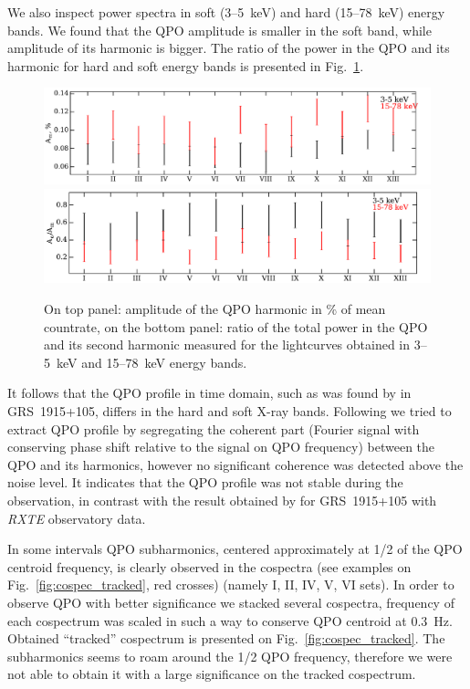 \documentclass[a4paper,fleqn,usenatbib]{mnras}
\begin{document}
We also inspect power spectra in soft (3--5~keV) and hard (15--78~keV) energy bands.
We found that the QPO amplitude is smaller in the soft band, while amplitude of its harmonic is bigger.
The ratio of the power in the QPO and its harmonic for hard and soft energy bands is presented in Fig.~\ref{fig:qpo_ratio}.
\begin{figure}
\includegraphics[width=\columnwidth]{qpo_amplitude.pdf}
\includegraphics[width=\columnwidth]{QPO_and_harmonic_ratio_ylabel.pdf}
        \caption{On top panel: amplitude of the QPO harmonic in \% of mean countrate, on the bottom panel: ratio of the total power in the QPO and its second harmonic measured for the lightcurves obtained in 3--5~keV and 15--78~keV energy bands.}
        \label{fig:qpo_ratio}
\end{figure}
It follows that the QPO profile in time domain, such as was found by \citet{2015MNRAS.446.3516I} in GRS~1915+105, differs in the hard and soft X-ray bands.
Following \citet{2015MNRAS.446.3516I} we tried to extract QPO profile by segregating the coherent part (Fourier signal with conserving phase shift relative to the signal on QPO frequency) between the QPO and its harmonics, however no significant coherence was detected above the noise level.
It indicates that the QPO profile was not stable during the observation, in contrast with the result obtained by \citet{2015MNRAS.446.3516I} for GRS~1915+105 with {\it RXTE} observatory data.

In some intervals QPO subharmonics, centered approximately at 1/2 of the QPO centroid frequency, is clearly observed in the cospectra (see examples on Fig.~\ref{fig:cospec_tracked}, red crosses) (namely I, II, IV, V, VI sets).
In order to observe QPO with better significance we stacked several cospectra, frequency of each cospectrum was scaled in such a way to conserve QPO centroid at 0.3~Hz.
Obtained ``tracked'' cospectrum is presented on Fig.~\ref{fig:cospec_tracked}.
The subharmonics seems to roam around the 1/2 QPO frequency, therefore we were not able to obtain it with a large significance on the tracked cospectrum.
\end{document}

